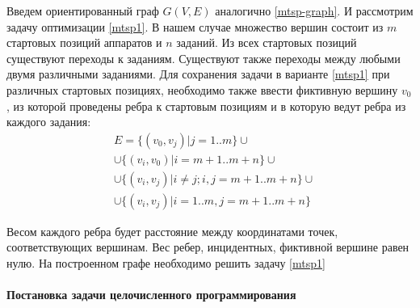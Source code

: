 \documentclass[a4paper,14pt,russian]{article}
\begin{document}
Введем ориентированный граф $G(V, E)$ аналогично \cref{mtsp-graph}. И рассмотрим задачу оптимизации \cref{mtsp1}.
В нашем случае множество вершин состоит из $m$ стартовых позиций аппаратов и $n$ заданий. Из всех стартовых позиций существуют переходы к заданиям. Существуют также переходы между любыми двумя различными заданиями. Для сохранения задачи в варианте \cref{mtsp1} при различных стартовых позициях, необходимо также ввести фиктивную вершину $v_0$, из которой проведены ребра к стартовым позициям и в которую ведут ребра из каждого задания:
\begin{align*}
& E = \{(v_0, v_j)|j = 1..m\} \cup \\
& \cup \{(v_i, v_0) | i = m+1..m+n\} \cup  \\
& \cup \{(v_i, v_j)| i \neq j; i,j=m+1..m+n\} \cup \\
& \cup \{(v_i, v_j)| i = 1..m, j = m+1..m+n\}
\end{align*}

Весом каждого ребра будет расстояние между координатами точек, соответствующих вершинам. Вес ребер, инцидентных, фиктивной вершине равен нулю.
На построенном графе необходимо решить задачу \cref{mtsp1}




\paragraph{Постановка задачи целочисленного программирования} ~\\
\end{document}
